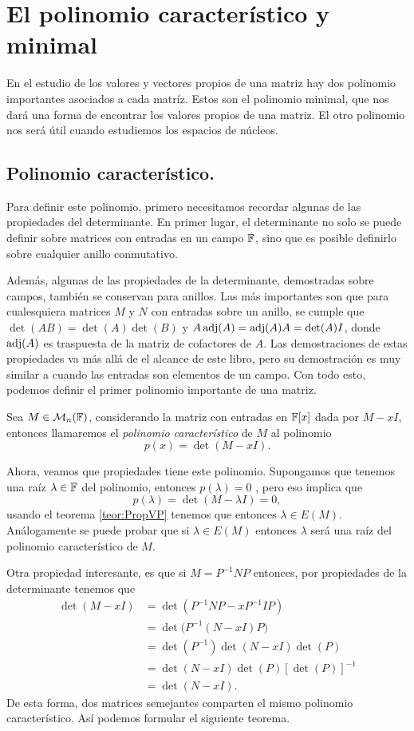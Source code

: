 \section{El polinomio característico y minimal}

En el estudio de los valores y vectores propios de una matriz hay dos polinomio importantes asociados a cada matríz. Estos son el polinomio minimal, que nos dará una forma de encontrar los valores propios de una matriz. El otro polinomio nos será útil cuando estudiemos los espacios de núcleos.

\subsection{Polinomio característico.}

Para definir este polinomio, primero necesitamos recordar algunas de las propiedades del determinante. En primer lugar, el determinante no solo se puede definir sobre matrices con entradas en un campo $\mathbb{F}$, sino que es posible definirlo sobre cualquier anillo conmutativo.

Además, algunas de las propiedades de la determinante, demostradas sobre campos, también se conservan para anillos. Las más importantes son que para cualesquiera matrices $M$ y $N$ con entradas sobre un anillo, se cumple que $\det(AB) = \det(A)\det(B)$ y $A \operatorname{adj}(A) = \operatorname{adj}(A) A = \det(A) I$, donde $\operatorname{adj}(A)$ es traspuesta de la matriz de cofactores de $A$. Las demostraciones de estas propiedades va más allá de el alcance de este libro, pero su demostración es muy similar a cuando las entradas son elementos de un campo. Con todo esto, podemos definir el primer polinomio importante de una matriz.

\begin{defi}
  Sea $M \in \mathcal{M}_n(\mathbb{F})$, considerando la matriz con entradas en $\mathbb{F}[x]$ dada por $M-xI$, entonces llamaremos el \emph{polinomio característico} de $M$ al polinomio
    \[ p(x) = \det(M-xI). \]
\end{defi}

Ahora, veamos que propiedades tiene este polinomio. Supongamos que tenemos una raíz $\lambda \in \mathbb{F}$ del polinomio, entonces $p(\lambda) = 0$ , pero eso implica que
\[ p(\lambda) = \det(M-\lambda I) = 0, \]
usando el teorema \ref{teor:PropVP} tenemos que entonces $\lambda \in E(M)$. Análogamente se puede probar que si $\lambda \in E(M)$ entonces $\lambda$ será una raíz del polinomio característico de $M$.

Otra propiedad interesante, es que si $M = P^{-1} N P$ entonces, por propiedades de la determinante tenemos que
\begin{align*}
  \det(M - xI) &= \det(P^{-1}NP - x P^{-1}IP) \\
    &= \det\bigl(P^{-1}(N- xI)P\bigr) \\
    &= \det(P^{-1})\det(N - xI) \det(P) \\
    &= \det(N - xI) \det(P) [\det(P)]^{-1} \\
    &= \det(N - xI).
\end{align*}
De esta forma, dos matrices semejantes comparten el mismo polinomio característico. Así podemos formular el siguiente teorema.

